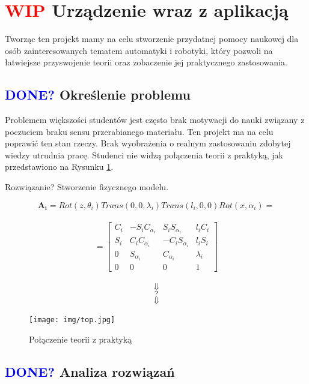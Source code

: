 \documentclass[11pt,titlepage,a4paper]{article}
\begin{document}
\newpage

\section{\textcolor{red}{WIP} Urządzenie wraz z aplikacją}

Tworząc ten projekt mamy na celu stworzenie przydatnej pomocy naukowej dla osób zainteresowanych tematem automatyki i robotyki, który pozwoli na łatwiejsze przyswojenie teorii oraz zobaczenie jej praktycznego zastosowania.

\subsection{\textcolor{blue}{DONE?} Określenie problemu}

Problemem większości studentów jest często brak motywacji do nauki związany z poczuciem braku sensu przerabianego materiału. Ten projekt ma na celu poprawić ten stan rzeczy.
Brak wyobrażenia o realnym zastosowaniu zdobytej wiedzy utrudnia pracę. Studenci nie widzą połączenia teorii z praktyką, jak przedstawiono na Rysunku \ref{teoriaVSprakrtyka}.

Rozwiązanie? Stworzenie fizycznego modelu.

\begin{figure}[h!]
    $$\boldsymbol{A_i}=Rot(z,\theta_i)Trans(0,0,\lambda_i)Trans(l_i,0,0)Rot(x,\alpha_i)=$$
    \\
    $$=\begin{bmatrix}
            C_i & -S_i C_{\alpha_i} & S_i S_{\alpha_i}  & l_i C_i   \\
            S_i & C_i C_{\alpha_i}  & -C_i S_{\alpha_i} & l_i S_i   \\
            0   & S_{\alpha_i}      & C_{\alpha_i}      & \lambda_i \\
            0   & 0                 & 0                 & 1
        \end{bmatrix}$$\cite{skryptPR}
    \\
    $$\Downarrow$$
    $$\mathord{?}$$
    $$\Downarrow$$
    \begin{center}
        \texttt{[image: img/top.jpg]}
    \end{center}
    \caption{Połączenie teorii z praktyką}
    \label{teoriaVSprakrtyka}
\end{figure}

\subsection{\textcolor{blue}{DONE?} Analiza rozwiązań}
\end{document}
